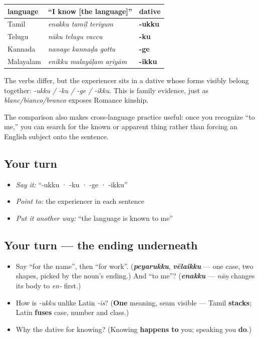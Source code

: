 \begin{grammarlens}[title={Grammar Lens: Four sentences, one construction}]
\noindent
\begin{tabularx}{\linewidth}{@{}>{\raggedright\arraybackslash}X>{\raggedright\arraybackslash}X>{\raggedright\arraybackslash}X@{}}
\toprule
\textbf{language} & \textbf{\textquotedblleft{}I know {[}the language{]}\textquotedblright{}} & \textbf{dative} \\
\midrule
Tamil & \emph{enakku tamiḻ teriyum} & \textbf{-ukku} \\
Telugu & \emph{nāku telugu vaccu} & \textbf{-ku} \\
Kannada & \emph{nanage kannaḍa gottu} & \textbf{-ge} \\
Malayalam & \emph{enikku malayāḷam aṟiyām} & \textbf{-ikku} \\
\bottomrule
\end{tabularx}

The verbs differ, but the experiencer sits in a dative whose forms visibly belong together: \emph{-ukku / -ku / -ge / -ikku}. This is family evidence, just as \emph{blanc/bianco/branco} exposes Romance kinship.

The comparison also makes cross-language practice useful: once you recognize \textquotedblleft{}to me,\textquotedblright{} you can search for the known or apparent thing rather than forcing an English subject onto the sentence.
\end{grammarlens}

\subsection*{Your turn}
\begin{itemize}
\raggedright
  \item \emph{Say it:} \textquotedblleft{}-ukku · -ku · -ge · -ikku\textquotedblright{}
  \item \emph{Point to:} the experiencer in each sentence
  \item \emph{Put it another way:} \textquotedblleft{}the language is known to me\textquotedblright{}
\end{itemize}

\subsection*{Your turn — the ending underneath}
\begin{itemize}
\raggedright
  \item Say \textquotedblleft{}for the name\textquotedblright{}, then \textquotedblleft{}for work\textquotedblright{}. (\emph{\textbf{peyarukku}}, \emph{\textbf{vēlaikku}} — one case, two shapes, picked by the noun's ending.) And \textquotedblleft{}to me\textquotedblright{}? (\emph{\textbf{enakku}} — \emph{nāṉ} changes its body to \emph{en-} first.)
  \item How is \emph{-ukku} unlike Latin \emph{-īs}? (\textbf{One} meaning, seam visible — Tamil \textbf{stacks}; Latin \textbf{fuses} case, number and class.)
  \item Why the dative for knowing? (Knowing \textbf{happens to} you; speaking you \textbf{do}.)
\end{itemize}

